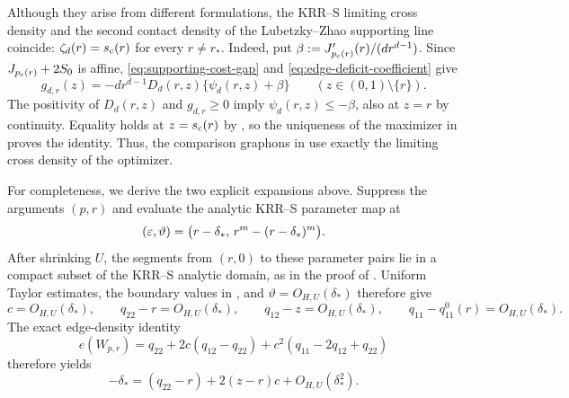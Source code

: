 \begin{remark}
Although they arise from different formulations, the KRR--S limiting cross
density and the second contact density of the Lubetzky--Zhao supporting line
coincide: \(\zeta_d(r)=\sc(r)\) for every \(r\ne r_*\).
Indeed, put \(\beta:=J_{\pc(r)}'(r)/(d r^{d-1})\).
Since \(J_{\pc(r)}+2S_0\) is affine,
\eqref{eq:supporting-cost-gap} and \eqref{eq:edge-deficit-coefficient} give
\[
  g_{d,r}(z)=-d r^{d-1}D_d(r,z)\bigl\{\psi_d(r,z)+\beta\bigr\}
  \qquad(z\in(0,1)\setminus\{r\}).
\]
The positivity of \(D_d(r,z)\) and \(g_{d,r}\ge0\) imply
\(\psi_d(r,z)\le-\beta\), also at \(z=r\) by continuity.
Equality holds at \(z=\sc(r)\) by , so
the uniqueness of the maximizer in  proves the
identity.  Thus, the comparison graphons in  use
exactly the limiting cross density of the optimizer.

For completeness, we derive the two explicit expansions above.  Suppress the
arguments \((p,r)\) and evaluate the analytic KRR--S parameter map at
\[
  (\eps,\vartheta)
  =\bigl(r-\delta_*,\,r^m-(r-\delta_*)^m\bigr).
\]
After shrinking $U$, the segments from $(r,0)$ to these parameter pairs
lie in a compact subset of the KRR--S analytic domain, as in the proof of
.  Uniform Taylor estimates, the boundary
values in , and
\(\vartheta=O_{H,U}(\delta_*)\) therefore give
\[
  c=O_{H,U}(\delta_*),\qquad
  q_{22}-r=O_{H,U}(\delta_*),\qquad
  q_{12}-z=O_{H,U}(\delta_*),\qquad
  q_{11}-q_{11}^0(r)=O_{H,U}(\delta_*).
\]
The exact edge-density identity
\[
  e(W_{p,r})
  =q_{22}+2c(q_{12}-q_{22})
   +c^2(q_{11}-2q_{12}+q_{22})
\]
therefore yields
\begin{equation}\label{eq:bipodal-edge-linearization}
  -\delta_*=(q_{22}-r)+2(z-r)c+O_{H,U}(\delta_*^2).
\end{equation}


\end{remark}
